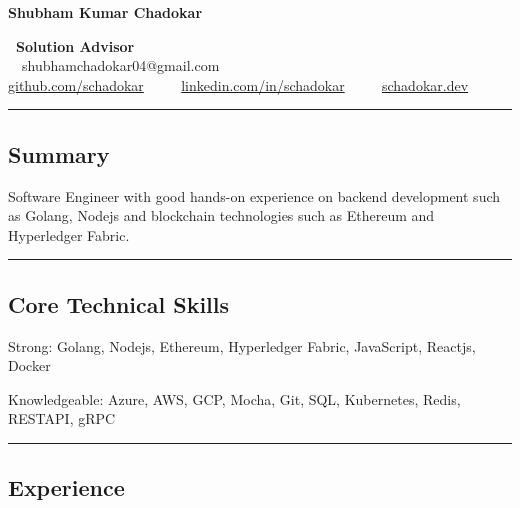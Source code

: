 \documentclass[11pt,a4paper]{article}
\newenvironment{indentsection}[1]%
{\begin{list}{}%
	{\setlength{\leftmargin}{#1}}%
	\item[]%
}
{\end{list}}
\begin{document}
\begin{center}
{\Huge \textbf{Shubham Kumar Chadokar}} 

\textbf{\large\ \textbf{Solution Advisor}} \\

\ \ shubhamchadokar04@gmail.com
\\

 {{\href{https://github.com/schadokar}{{github.com/schadokar}}}} \ \ \textbullet 
\ \ {{\href {https://www.linkedin.com/in/schadokar/}{{linkedin.com/in/schadokar}}}} \ \ \textbullet
\ \ {{\href {https://schadokar.dev}{{schadokar.dev}}}} \ \ \
\end{center}

\hrule
\vspace{-0.4em}
\subsection*{Summary}

Software Engineer with good hands-on experience on backend development such as Golang, Nodejs and blockchain technologies such as Ethereum and Hyperledger Fabric. 

\vspace{0.4em}

             
\hrule
\vspace{-0.4em}
\subsection*{Core Technical Skills}

\begin{indentsection}{\parindent}
\begin{description*}
	\item[Strong:]
	Golang, Nodejs, Ethereum, Hyperledger Fabric, JavaScript, Reactjs, Docker
	\item[Knowledgeable:]
	Azure, AWS, GCP, Mocha, Git, SQL, Kubernetes, Redis, RESTAPI, gRPC\end{description*}
\end{indentsection}

\hrule
\vspace{-0.4em}
\subsection*{Experience}
\end{document}
